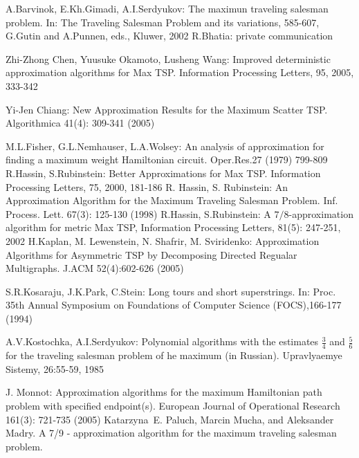 \documentclass[a4, 11pt]{article}
\newcommand{\<}{\langle}
\renewcommand{\>}{\rangle}
\begin{document}
\begin{thebibliography}{99}
 A.Barvinok, E.Kh.Gimadi, A.I.Serdyukov: The maximun traveling salesman problem.
In: The Traveling Salesman Problem and its variations, 585-607, G.Gutin and A.Punnen, eds., Kluwer, 2002
 R.Bhatia: private communication

 Zhi-Zhong Chen, Yuusuke Okamoto, Lusheng Wang: Improved deterministic approximation algorithms for Max TSP.
Information Processing Letters, 95, 2005, 333-342

 Yi-Jen Chiang: New Approximation Results for the Maximum Scatter TSP. Algorithmica 41(4): 309-341 (2005)


 M.L.Fisher, G.L.Nemhauser, L.A.Wolsey: An analysis of approximation for finding a maximum weight Hamiltonian circuit. Oper.Res.27 (1979) 799-809
 R.Hassin, S.Rubinstein: Better Approximations for Max TSP. Information Processing Letters, 75, 2000,
181-186
 R. Hassin, S. Rubinstein: An Approximation Algorithm for the Maximum Traveling Salesman Problem. Inf. Process. Lett. 67(3): 125-130 (1998)
 R.Hassin, S.Rubinstein: A $7/8$-approximation algorithm for metric Max TSP,  Information Processing Letters, 81(5): 247-251, 2002
 H.Kaplan, M. Lewenstein, N. Shafrir, M. Sviridenko: Approximation Algorithms for Asymmetric TSP by
Decomposing Directed Regualar Multigraphs. J.ACM 52(4):602-626 (2005)

 S.R.Kosaraju, J.K.Park, C.Stein: Long tours and short superstrings. In: Proc. 35th Annual Symposium on
Foundations of Computer Science (FOCS),166-177 (1994)

 A.V.Kostochka, A.I.Serdyukov: Polynomial algorithms with the estimates $\frac{3}{4}$ and $\frac{5}{6}$
for the traveling salesman problem of he maximum (in Russian). Upravlyaemye Sistemy, 26:55-59, 1985

 J. Monnot: Approximation algorithms for the maximum Hamiltonian path problem with specified endpoint(s). European Journal of Operational Research 161(3): 721-735 (2005)
Katarzyna~E. Paluch, Marcin Mucha, and Aleksander Madry.
\newblock A 7/9 - approximation algorithm for the maximum traveling salesman
  problem.
\end{thebibliography}
\end{document}
